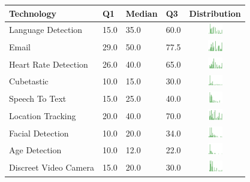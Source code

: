 \begin{table}[H!]
\begin{center}
\small
\begin{tabular}{| p{2cm} | p{1cm} | p{1cm} | p{1cm} | c |}
\hline
Technology & Q1 &  Median & Q3 & Distribution  \\ 
\hline
Language Detection  & 15.0 & 35.0 & 60.0 & \includegraphics[width = 2cm, height = 0.5cm]{tables/languagedetectionben} \\ 
Email  & 29.0 & 50.0 & 77.5 & \includegraphics[width = 2cm, height = 0.5cm]{tables/emailben} \\ 
Heart Rate Detection  & 26.0 & 40.0 & 65.0 & \includegraphics[width = 2cm, height = 0.5cm]{tables/heartratedetectionben} \\ 
Cubetastic  & 10.0 & 15.0 & 30.0 & \includegraphics[width = 2cm, height = 0.5cm]{tables/cubetasticben} \\ 
Speech To Text  & 15.0 & 25.0 & 40.0 & \includegraphics[width = 2cm, height = 0.5cm]{tables/speechtotextben} \\ 
Location Tracking  & 20.0 & 40.0 & 70.0 & \includegraphics[width = 2cm, height = 0.5cm]{tables/locationtrackingben} \\ 
Facial Detection  & 10.0 & 20.0 & 34.0 & \includegraphics[width = 2cm, height = 0.5cm]{tables/facialdetectionben} \\ 
Age Detection  & 10.0 & 12.0 & 22.0 & \includegraphics[width = 2cm, height = 0.5cm]{tables/agedetectionben} \\ 
Discreet Video Camera  & 15.0 & 20.0 & 30.0 & \includegraphics[width = 2cm, height = 0.5cm]{tables/discreetvideocameraben} \\ 

\end{tabular}
\end{center}
\end{table}
